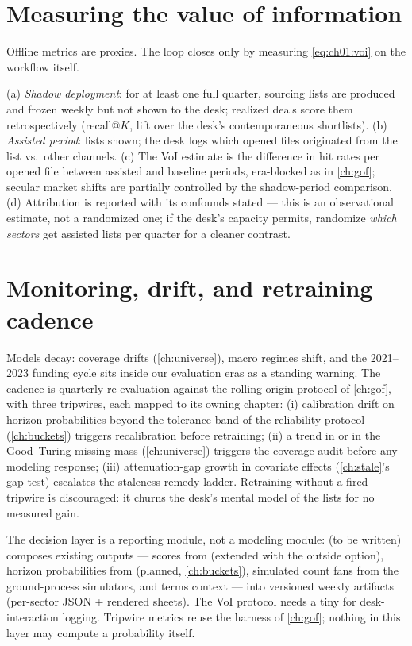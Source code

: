 \section{Measuring the value of information}\label{ch12:sec:voi}

Offline metrics are proxies. The loop closes only by measuring
\cref{eq:ch01:voi} on the workflow itself.

\begin{protocol}\label{prot:ch12:voi}
(a) \emph{Shadow deployment}: for at least one full quarter, sourcing
lists are produced and frozen weekly but not shown to the desk; realized
deals score them retrospectively (recall@$K$, lift over the desk's
contemporaneous shortlists). (b) \emph{Assisted period}: lists shown;
the desk logs which opened files originated from the list vs.\ other
channels. (c) The VoI estimate is the difference in hit rates per opened
file between assisted and baseline periods, era-blocked as in
\cref{ch:gof}; secular market shifts are partially controlled by the
shadow-period comparison. (d) Attribution is reported with its
confounds stated --- this is an observational estimate, not a randomized
one; if the desk's capacity permits, randomize \emph{which sectors} get
assisted lists per quarter for a cleaner contrast.
\end{protocol}

\section{Monitoring, drift, and retraining cadence}\label{ch12:sec:monitoring}

Models decay: coverage drifts (\cref{ch:universe}), macro regimes shift,
and the 2021--2023 funding cycle sits inside our evaluation eras as a
standing warning. The cadence is quarterly re-evaluation against the
rolling-origin protocol of \cref{ch:gof}, with three tripwires, each
mapped to its owning chapter: (i) calibration drift on horizon
probabilities beyond the tolerance band of the reliability protocol
(\cref{ch:buckets}) triggers recalibration before retraining; (ii) a
trend in  or in the Good--Turing missing mass
(\cref{ch:universe}) triggers the coverage audit before any modeling
response; (iii) attenuation-gap growth in covariate effects
(\cref{ch:stale}'s gap test) escalates the staleness remedy ladder.
Retraining without a fired tripwire is discouraged: it churns the
desk's mental model of the lists for no measured gain.

\begin{codehooks}
The decision layer is a reporting module, not a modeling module:
 (to be written) composes existing outputs ---
 scores from  (extended with the
outside option), horizon probabilities from 
(planned, \cref{ch:buckets}), simulated count fans from the ground-process
simulators, and terms context --- into versioned weekly artifacts
(per-sector JSON + rendered sheets). The VoI protocol needs a tiny
 for desk-interaction logging. Tripwire metrics
reuse the  harness of \cref{ch:gof}; nothing in this layer
may compute a probability itself.
\end{codehooks}
